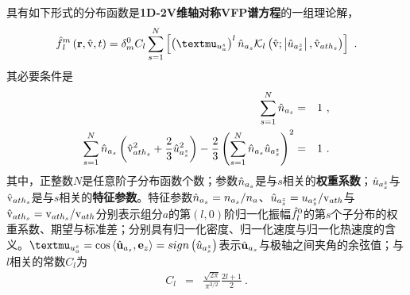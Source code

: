   \begin{proposition} \label{定理-VFP的解1D2V-King混合分布s}
      具有如下形式的分布函数是\textbf{1D-2V维轴对称VFP谱方程}的一组理论解，
      \begin{eqnarray}
        \fhlm \left(\r,\rmvh,t \right) = \delta_m^0  C_l \sum_{s=1}^{N}  \left [ \left (\muuas \right)^l \nhas \Kl \left(\rmvh;\left |\uhazs \right |,\vhaths \right) \right] ~.  \label{fhlfhls}
      \end{eqnarray}
      其必要条件是
      \begin{eqnarray}
        \sum_{s=1}^{N} \hat{n}_{a_s}  &=&  1 ~, \label{nhasAxis0}
        \\
        \sum_{s=1}^{N} \hat{n}_{a_s} \left(\hat{\mathrm{v}}_{{ath}_s}^2 + \frac{2}{3} {\hat{u}}_{a_s^z}^2 \right) - \frac{2}{3}  \left(\sum_{s=1}^{N} \hat{n}_{a_s} {\hat{u}}_{a_s^z} \right)^2   &=& 1 ~ . \label{ThasAxis0}
      \end{eqnarray}
      其中，正整数$N$是任意阶子分布函数个数；参数$\hat{n}_{a_s}$是与$s$相关的\textbf{权重系数}；${\hat{u}}_{a_s^z}$与$\hat{\mathrm{v}}_{{ath}_s}$是与$s$相关的\textbf{特征参数}。特征参数$\hat{n}_{a_s}=n_{a_s} / n_a$、${\hat{u}}_{a_s^z}=u_{a_z^s} / \mathrm{v}_{ath}$与$\hat{\mathrm{v}}_{{ath}_s} = {\mathrm{v}}_{{ath}_s} / \mathrm{v}_{ath}$分别表示组分$a$的第$(l,0)$阶归一化振幅$\hat{f}_l^0$的第$s$个子分布的权重系数、期望与标准差；分别具有归一化密度、归一化速度与归一化热速度的含义。$\muuas=\cos{\left <\uhas,\bfe_z \right>}=sign \left(\uhazs \right)$表示$\hat{\mathbf{u}}_{a_s}$与极轴之间夹角的余弦值；与$l$相关的常数$C_l$为
      \begin{eqnarray}
        C_l &=& \frac{\sqrt{2 \pi}}{\pi^{3/2}} \frac{2 l + 1}{2}  ~.  \label{Cl}
      \end{eqnarray}
  \end{proposition}

